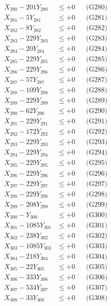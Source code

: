\documentclass[a4paper,10pt]{article}
\begin{document}
{\begin{align}
X_{280} - 201Y_{280} &\leq +0 && \text{(G280)} \\
\allowbreak
X_{281} - 5Y_{281} &\leq +0 && \text{(G281)} \\
X_{282} - 8Y_{282} &\leq +0 && \text{(G282)} \\
X_{283} - 229Y_{283} &\leq +0 && \text{(G283)} \\
X_{284} - 20Y_{284} &\leq +0 && \text{(G284)} \\
X_{285} - 229Y_{285} &\leq +0 && \text{(G285)} \\
X_{286} - 229Y_{286} &\leq +0 && \text{(G286)} \\
X_{287} - 57Y_{287} &\leq +0 && \text{(G287)} \\
X_{288} - 109Y_{288} &\leq +0 && \text{(G288)} \\
X_{289} - 229Y_{289} &\leq +0 && \text{(G289)} \\
X_{290} - 62Y_{290} &\leq +0 && \text{(G290)} \\
\allowbreak
X_{291} - 229Y_{291} &\leq +0 && \text{(G291)} \\
X_{292} - 172Y_{292} &\leq +0 && \text{(G292)} \\
X_{293} - 229Y_{293} &\leq +0 && \text{(G293)} \\
X_{294} - 229Y_{294} &\leq +0 && \text{(G294)} \\
X_{295} - 229Y_{295} &\leq +0 && \text{(G295)} \\
X_{296} - 229Y_{296} &\leq +0 && \text{(G296)} \\
X_{297} - 229Y_{297} &\leq +0 && \text{(G297)} \\
X_{298} - 229Y_{298} &\leq +0 && \text{(G298)} \\
X_{299} - 208Y_{299} &\leq +0 && \text{(G299)} \\
X_{300} - Y_{300} &\leq +0 && \text{(G300)} \\
\allowbreak
X_{301} - 1085Y_{301} &\leq +0 && \text{(G301)} \\
X_{302} - 238Y_{302} &\leq +0 && \text{(G302)} \\
X_{303} - 1085Y_{303} &\leq +0 && \text{(G303)} \\
X_{304} - 218Y_{304} &\leq +0 && \text{(G304)} \\
X_{305} - 22Y_{305} &\leq +0 && \text{(G305)} \\
X_{306} - 333Y_{306} &\leq +0 && \text{(G306)} \\
X_{307} - 534Y_{307} &\leq +0 && \text{(G307)} \\
X_{308} - 33Y_{308} &\leq +0 && \text{(G308)} \\

\end{align}}
\end{document}
